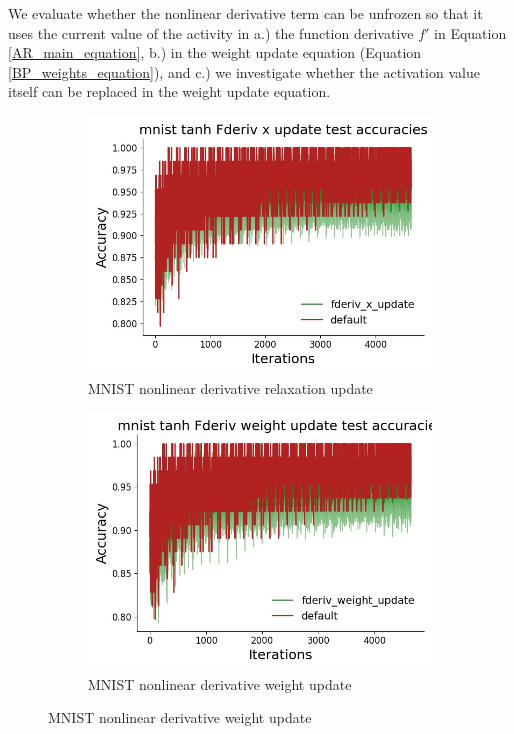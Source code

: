 We evaluate whether the nonlinear derivative term can be unfrozen so that it uses the current value of the activity in a.) the function derivative $f'$ in Equation \ref{AR_main_equation}, b.) in the weight update equation (Equation \ref{BP_weights_equation}), and c.) we investigate whether the activation value itself can be replaced in the weight update equation.
\begin{figure}[htb]
\centering
  \begin{subfigure}[b]{0.4\linewidth}
    \centering
    \includegraphics[width=0.75\linewidth]{chapter_6_figures/AR/mnist_tanh_Fderiv_x_update_test_accuracies_prelim_2.jpg} 
    \caption{MNIST nonlinear derivative relaxation update} 
    \vspace{4ex}
  \end{subfigure}%
  \begin{subfigure}[b]{0.4\linewidth}
    \centering
    \includegraphics[width=0.75\linewidth]{chapter_6_figures/AR/mnist_tanh_Fderiv_weight_update_test_accuracies_prelim_2.jpg} 
    \caption{MNIST nonlinear derivative weight update} 
    \vspace{4ex}

\end{subfigure}
\end{figure}
